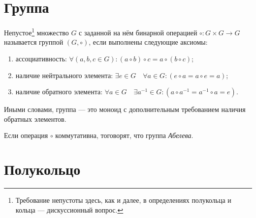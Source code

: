 \section{Группа}

\begin{definition}[Группа]
Непустое\footnote{Требование непустоты здесь, как и далее, в определениях полукольца и кольца --- дискуссионный вопрос.} множество $G$ с заданной на нём бинарной операцией $\circ: {G} \times {G} \to {G}$ называется группой $(G ,\circ)$, если выполнены следующие аксиомы:
\begin{enumerate}
\item ассоциативность: $\forall (a,b,c\in G)\colon (a\circ b)\circ c = a\circ (b \circ c)$;
\item наличие нейтрального элемента: $ \exists e \in G \quad \forall a\in G\colon (e \circ a = a \circ e = a)$;
\item наличие обратного элемента: $ \forall a\in G\quad \exists a^{-1}\in G\colon (a \circ a^{-1}=a^{-1} \circ a = e)$.
\end{enumerate}

Иными словами, группа --- это моноид с дополнительным требованием наличия обратных элементов.

Если операция $\circ$ коммутативна, тоговорят, что группа \textit{Абелева}.
\end{definition}


\section{Полукольцо}

